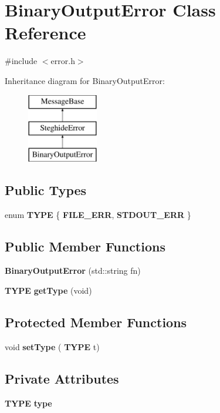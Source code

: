 \section{Binary\+Output\+Error Class Reference}
\label{classBinaryOutputError}


{\ttfamily \#include $<$error.\+h$>$}

Inheritance diagram for Binary\+Output\+Error\+:\begin{figure}[H]
\begin{center}
\leavevmode
\includegraphics[height=3.000000cm]{classBinaryOutputError}
\end{center}
\end{figure}
\subsection*{Public Types}
\begin{DoxyCompactItemize}
\item 
enum \textbf{ T\+Y\+PE} \{ \textbf{ F\+I\+L\+E\+\_\+\+E\+RR}, 
\textbf{ S\+T\+D\+O\+U\+T\+\_\+\+E\+RR}
 \}
\end{DoxyCompactItemize}
\subsection*{Public Member Functions}
\begin{DoxyCompactItemize}
\item 
\textbf{ Binary\+Output\+Error} (std\+::string fn)
\item 
\textbf{ T\+Y\+PE} \textbf{ get\+Type} (void)
\end{DoxyCompactItemize}
\subsection*{Protected Member Functions}
\begin{DoxyCompactItemize}
\item 
void \textbf{ set\+Type} (\textbf{ T\+Y\+PE} t)
\end{DoxyCompactItemize}
\subsection*{Private Attributes}
\begin{DoxyCompactItemize}
\item 
\textbf{ T\+Y\+PE} \textbf{ type}
\end{DoxyCompactItemize}

